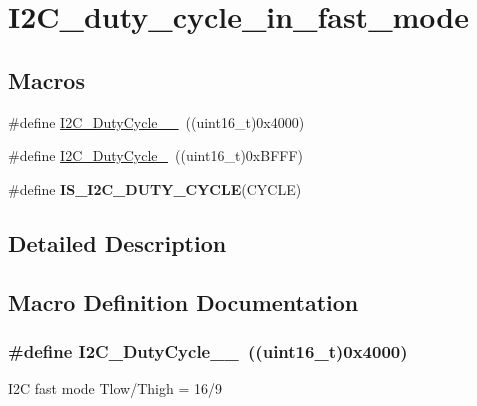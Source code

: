 \hypertarget{group___i2_c__duty__cycle__in__fast__mode}{}\section{I2\+C\+\_\+duty\+\_\+cycle\+\_\+in\+\_\+fast\+\_\+mode}
\label{group___i2_c__duty__cycle__in__fast__mode}
\subsection*{Macros}
\begin{DoxyCompactItemize}
\item 
\#define \hyperlink{group___i2_c__duty__cycle__in__fast__mode_ga2b4ff186808a8095fc2d1b8193f30ce1}{I2\+C\+\_\+\+Duty\+Cycle\+\_\+\_}~((uint16\+\_\+t)0x4000)
\item 
\#define \hyperlink{group___i2_c__duty__cycle__in__fast__mode_gafe0af31970aceef0fa8df6a10bef35db}{I2\+C\+\_\+\+Duty\+Cycle\+\_}~((uint16\+\_\+t)0x\+B\+F\+F\+F)
\item 
\#define {\bfseries I\+S\+\_\+\+I2\+C\+\_\+\+D\+U\+T\+Y\+\_\+\+C\+Y\+C\+L\+E}(C\+Y\+C\+L\+E)
\end{DoxyCompactItemize}


\subsection{Detailed Description}


\subsection{Macro Definition Documentation}
\hypertarget{group___i2_c__duty__cycle__in__fast__mode_ga2b4ff186808a8095fc2d1b8193f30ce1}{}
\subsubsection[{I2\+C\+\_\+\+Duty\+Cycle\+\_\+16\+\_\+9}]{\setlength{\rightskip}{0pt plus 5cm}\#define I2\+C\+\_\+\+Duty\+Cycle\+\_\+\_~((uint16\+\_\+t)0x4000)}\label{group___i2_c__duty__cycle__in__fast__mode_ga2b4ff186808a8095fc2d1b8193f30ce1}
I2\+C fast mode Tlow/\+Thigh = 16/9 \hypertarget{group___i2_c__duty__cycle__in__fast__mode_gafe0af31970aceef0fa8df6a10bef35db}{}
